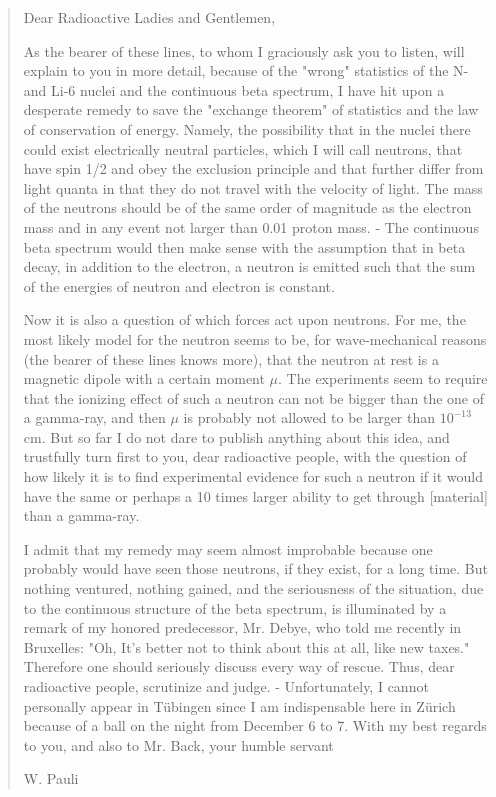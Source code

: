 \documentclass[12pt]{book}
\begin{document}
\begin{quote}
Dear Radioactive Ladies and Gentlemen,

As the bearer of these lines, to whom I graciously ask you to listen, will explain to you in more
detail, because of the "wrong" statistics of the N- and Li-6 nuclei and the continuous beta
spectrum, I have hit upon a desperate remedy to save the "exchange theorem" of statistics and
the law of conservation of energy. Namely, the possibility that in the nuclei there could exist
electrically neutral particles, which I will call neutrons, that have spin 1/2 and obey the exclusion
principle and that further differ from light quanta in that they do not travel with the velocity of
light. The mass of the neutrons should be of the same order of magnitude as the electron mass and
in any event not larger than 0.01 proton mass. - The continuous beta spectrum would then make
sense with the assumption that in beta decay, in addition to the electron, a neutron is emitted such
that the sum of the energies of neutron and electron is constant.

Now it is also a question of which forces act upon neutrons. For me, the most likely model for the
neutron seems to be, for wave-mechanical reasons (the bearer of these lines knows more), that the
neutron at rest is a magnetic dipole with a certain moment $\mu$. The experiments seem to require
that the ionizing effect of such a neutron can not be bigger than the one of a gamma-ray, and then
$\mu$ is probably not allowed to be larger than $10^{-13}$cm.
But so far I do not dare to publish anything about this idea, and trustfully turn first to you, dear
radioactive people, with the question of how likely it is to find experimental evidence for such a
neutron if it would have the same or perhaps a 10 times larger ability to get through [material]
than a gamma-ray.

I admit that my remedy may seem almost improbable because one probably would have seen
those neutrons, if they exist, for a long time. But nothing ventured, nothing gained, and the
seriousness of the situation, due to the continuous structure of the beta spectrum, is illuminated by
a remark of my honored predecessor, Mr. Debye, who told me recently in Bruxelles: "Oh, It's
better not to think about this at all, like new taxes." Therefore one should seriously discuss every
way of rescue. Thus, dear radioactive people, scrutinize and judge. - Unfortunately, I cannot
personally appear in T\"{u}bingen since I am indispensable here in Z\"{u}rich because of a ball on the
night from December 6 to 7. With my best regards to you, and also to Mr. Back, your humble
servant

                                                     W. Pauli

\end{quote}
\end{document}
